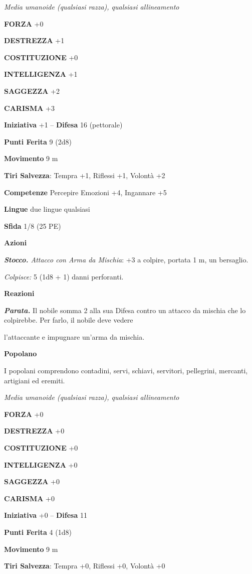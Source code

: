 \begin{multicols}{2}
\emph{Media umanoide (qualsiasi razza), qualsiasi allineamento}

\textbf{FORZA} +0

\textbf{DESTREZZA} +1

\textbf{COSTITUZIONE} +0

\textbf{INTELLIGENZA} +1

\textbf{SAGGEZZA} +2

\textbf{CARISMA} +3

\textbf{Iniziativa} +1 -- \textbf{Difesa} 16 (pettorale)

\textbf{Punti Ferita} 9 (2d8)

\textbf{Movimento} 9 m

\textbf{Tiri Salvezza}: Tempra +1, Riflessi +1, Volontà +2 

\textbf{Competenze} Percepire Emozioni +4, Ingannare +5

\textbf{Lingue} due lingue qualsiasi

\textbf{Sfida} 1/8 (25 PE)

\textbf{Azioni}

\emph{\textbf{Stocco.} Attacco con Arma da Mischia}: +3 a colpire, portata 1 m, un bersaglio.

\emph{Colpisce:} 5 (1d8 + 1) danni perforanti.

\textbf{Reazioni}

\emph{\textbf{Parata.}} Il nobile somma 2 alla sua Difesa contro un attacco da mischia che lo colpirebbe. Per farlo, il nobile deve vedere

l'attaccante e impugnare un'arma da mischia.

\medskip\textbf{Popolano}

I popolani comprendono contadini, servi, schiavi, servitori, pellegrini, mercanti, artigiani ed eremiti.

\emph{Media umanoide (qualsiasi razza), qualsiasi allineamento}

\textbf{FORZA} +0

\textbf{DESTREZZA} +0

\textbf{COSTITUZIONE} +0

\textbf{INTELLIGENZA} +0

\textbf{SAGGEZZA} +0

\textbf{CARISMA} +0

\textbf{Iniziativa} +0 -- \textbf{Difesa} 11

\textbf{Punti Ferita} 4 (1d8)

\textbf{Movimento} 9 m

\textbf{Tiri Salvezza}: Tempra +0, Riflessi +0, Volontà +0 


\end{multicols}
